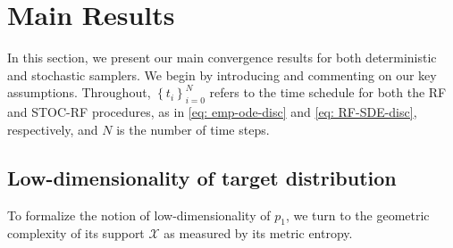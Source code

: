 \documentclass{article}
\theoremstyle{plain}
\theoremstyle{definition}
\theoremstyle{remark}
\def\cX{\mathcal{X}}
\newcommand{\bc}[1]{\left\{{#1}\right\}}
\begin{document}
\section{Main Results}
\label{sec: main results}
In this section, we present our main convergence results for both deterministic and stochastic samplers. We  begin by introducing and commenting on our key assumptions. Throughout, $\bc{t_i}_{i=0}^N$ refers to the time schedule for both the RF and STOC-RF procedures, as in  \eqref{eq: emp-ode-disc} and \eqref{eq: RF-SDE-disc}, respectively, and $N$ is the number of time steps.

\subsection{Low-dimensionality of target distribution}
To formalize the notion of low-dimensionality of $p_1$, we turn to the geometric complexity of its support $\cX$ as measured by its metric entropy. 
\end{document}
